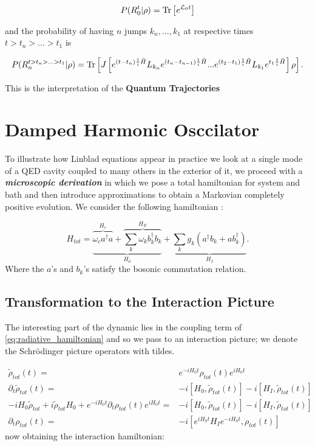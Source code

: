 \begin{equation}
  P(R_{0}^{t}|\rho) = \mathrm{Tr}\left[e^{\mathcal{L}_{0}t}\right]
\end{equation}

and the probability of having $n$ jumps $k_{n},...,k_{1}$ at respective times $t>t_{n}>...>t_{1}$ is

\begin{equation}
  P(R_{n}^{t>t_{n}>...>t_{1}}|\rho) = \mathrm{Tr}\left[J\left[e^{(t-t_{n})\frac{1}{i}\tilde{H}}L_{k_{n}}e^{(t_{n}-t_{n-1})\frac{1}{i}\tilde{H}}...e^{(t_{2}-t_{1})\frac{1}{i}\tilde{H}}L_{k_{1}}e^{t_{1}\frac{1}{i}\tilde{H}}\right]\rho\right].
\end{equation}

This is the interpretation of the \textbf{Quantum Trajectories} \cite{wiseman_quantum_2010,hornberger2009introduction}

\section{Damped Harmonic Osccilator}
To illustrate how Linblad equations appear in practice we look at a single mode of a QED cavity coupled to many others in the exterior of it,
we proceed with a \textbf{\textit{microscopic derivation}} in which we pose a total hamiltonian for system and bath and then introduce
approximations to obtain a Markovian completely positive evolution. We consider the following hamiltonian \cite{wiseman_quantum_2010,walls_quantum_2008}:

\begin{equation}\label{eq:radiative_hamiltonian}
H_{tot} = \underbrace{\overbrace{\omega_{c} a^{\dagger}a}^{H_{c}} + \overbrace{\sum_{k}\omega_{k}b^{\dagger}_{k}b_{k}}^{H_{E}} }_{H_{0}}+ \underbrace{\sum_{k}g_{k}\left( a^{\dagger}b_{k} + ab^{\dagger}_{k} \right)}_{H_{I}}.
\end{equation}
Where the $a$'s and $b_k$'s satisfy the bosonic commutation relation.
\subsection{Transformation to the Interaction Picture}
The interesting part of the dynamic lies in the coupling term of \eqref{eq:radiative_hamiltonian} and so we pass to an interaction picture; we
denote the Schrödinger picture operators with tildes.

\begin{align}
  \tilde{\rho}_{tot}(t) =& e^{-iH_{0}t} \rho_{tot}(t)e^{iH_{0}t}\\
  \partial_{t} \tilde{\rho}_{tot}(t) =& -i[H_{0}, \tilde{\rho}_{tot}(t)] - i[H_I,\tilde{\rho}_{tot}(t) ]\\
  -iH_{0}\tilde{\rho}_{tot} +i\tilde{\rho}_{tot}H_{0} + e^{-iH_{0}t}\partial_{t} \rho_{tot}(t)e^{iH_{0}t} =&-i[H_{0}, \tilde{\rho}_{tot}(t)] - i[H_I,\tilde{\rho}_{tot}(t) ]\\
\partial_{t} \rho_{tot}(t) =&-i[e^{iH_{0}t}H_Ie^{-iH_{0}t},\rho_{tot}(t) ]
\end{align}
 now obtaining the interaction hamiltonian:

